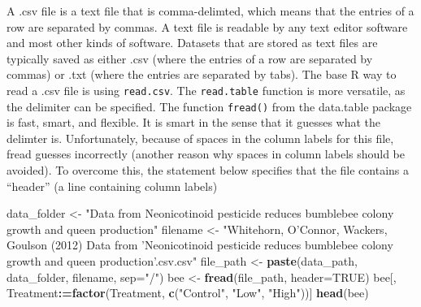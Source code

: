 \documentclass[]{book}
\newenvironment{Shaded}{\begin{snugshade}}{\end{snugshade}}
\newcommand{\KeywordTok}[1]{\textcolor[rgb]{0.13,0.29,0.53}{\textbf{#1}}}
\newcommand{\DataTypeTok}[1]{\textcolor[rgb]{0.13,0.29,0.53}{#1}}
\newcommand{\StringTok}[1]{\textcolor[rgb]{0.31,0.60,0.02}{#1}}
\newcommand{\OtherTok}[1]{\textcolor[rgb]{0.56,0.35,0.01}{#1}}
\newcommand{\OperatorTok}[1]{\textcolor[rgb]{0.81,0.36,0.00}{\textbf{#1}}}
\newcommand{\ErrorTok}[1]{\textcolor[rgb]{0.64,0.00,0.00}{\textbf{#1}}}
\newcommand{\NormalTok}[1]{#1}
\theoremstyle{definition}
\theoremstyle{definition}
\theoremstyle{definition}
\theoremstyle{remark}
\begin{document}
A .csv file is a text file that is comma-delimted, which means that the
entries of a row are separated by commas. A text file is readable by any
text editor software and most other kinds of software. Datasets that are
stored as text files are typically saved as either .csv (where the
entries of a row are separated by commas) or .txt (where the entries are
separated by tabs). The base R way to read a .csv file is using
\texttt{read.csv}. The \texttt{read.table} function is more versatile,
as the delimiter can be specified. The function \texttt{fread()} from
the data.table package is fast, smart, and flexible. It is smart in the
sense that it guesses what the delimter is. Unfortunately, because of
spaces in the column labels for this file, fread guesses incorrectly
(another reason why spaces in column labels should be avoided). To
overcome this, the statement below specifies that the file contains a
``header'' (a line containing column labels)

\begin{Shaded}
\begin{Highlighting}[]
\NormalTok{data_folder <-}\StringTok{ "Data from Neonicotinoid pesticide reduces bumblebee colony growth and queen production"}
\NormalTok{filename <-}\StringTok{ "Whitehorn, O'Connor, Wackers, Goulson (2012) Data from 'Neonicotinoid pesticide reduces bumblebee colony growth and queen production'.csv.csv"}
\NormalTok{file_path <-}\StringTok{ }\KeywordTok{paste}\NormalTok{(data_path, data_folder, filename, }\DataTypeTok{sep=}\StringTok{"/"}\NormalTok{)}
\NormalTok{bee <-}\StringTok{ }\KeywordTok{fread}\NormalTok{(file_path, }\DataTypeTok{header=}\OtherTok{TRUE}\NormalTok{)}
\NormalTok{bee[, Treatment}\OperatorTok{:}\ErrorTok{=}\KeywordTok{factor}\NormalTok{(Treatment, }\KeywordTok{c}\NormalTok{(}\StringTok{"Control"}\NormalTok{, }\StringTok{"Low"}\NormalTok{, }\StringTok{"High"}\NormalTok{))]}
\KeywordTok{head}\NormalTok{(bee)}
\end{Highlighting}
\end{Shaded}
\end{document}
